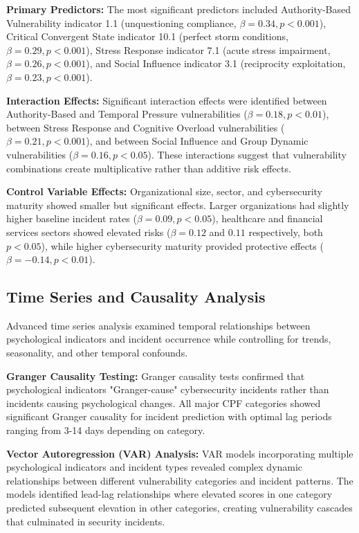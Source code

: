 \documentclass[10pt, twocolumn]{article}
\begin{document}
\textbf{Primary Predictors:} The most significant predictors included Authority-Based Vulnerability indicator 1.1 (unquestioning compliance, $\beta = 0.34, p < 0.001$), Critical Convergent State indicator 10.1 (perfect storm conditions, $\beta = 0.29, p < 0.001$), Stress Response indicator 7.1 (acute stress impairment, $\beta = 0.26, p < 0.001$), and Social Influence indicator 3.1 (reciprocity exploitation, $\beta = 0.23, p < 0.001$).

\textbf{Interaction Effects:} Significant interaction effects were identified between Authority-Based and Temporal Pressure vulnerabilities ($\beta = 0.18, p < 0.01$), between Stress Response and Cognitive Overload vulnerabilities ($\beta = 0.21, p < 0.001$), and between Social Influence and Group Dynamic vulnerabilities ($\beta = 0.16, p < 0.05$). These interactions suggest that vulnerability combinations create multiplicative rather than additive risk effects.

\textbf{Control Variable Effects:} Organizational size, sector, and cybersecurity maturity showed smaller but significant effects. Larger organizations had slightly higher baseline incident rates ($\beta = 0.09, p < 0.05$), healthcare and financial services sectors showed elevated risks ($\beta = 0.12$ and $0.11$ respectively, both $p < 0.05$), while higher cybersecurity maturity provided protective effects ($\beta = -0.14, p < 0.01$).

\subsection{Time Series and Causality Analysis}

Advanced time series analysis examined temporal relationships between psychological indicators and incident occurrence while controlling for trends, seasonality, and other temporal confounds.

\textbf{Granger Causality Testing:} Granger causality tests confirmed that psychological indicators "Granger-cause" cybersecurity incidents rather than incidents causing psychological changes. All major CPF categories showed significant Granger causality for incident prediction with optimal lag periods ranging from 3-14 days depending on category.

\textbf{Vector Autoregression (VAR) Analysis:} VAR models incorporating multiple psychological indicators and incident types revealed complex dynamic relationships between different vulnerability categories and incident patterns. The models identified lead-lag relationships where elevated scores in one category predicted subsequent elevation in other categories, creating vulnerability cascades that culminated in security incidents.
\end{document}
